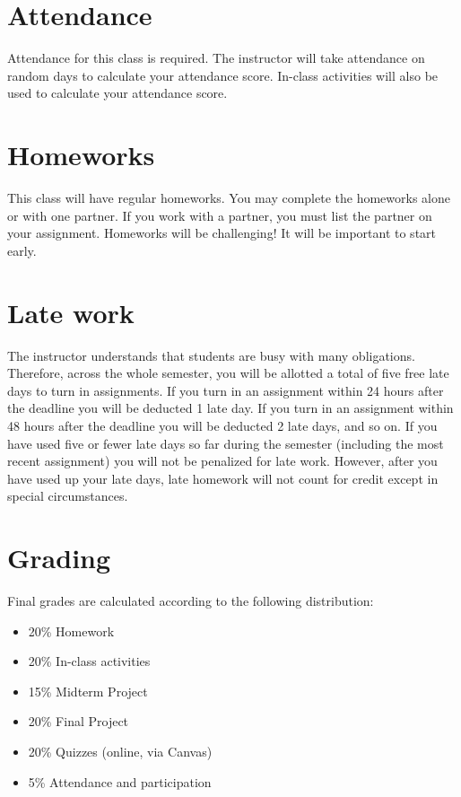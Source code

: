 \documentclass[10pt]{memoir}
\begin{document}
\section{\textbf{Attendance}}
Attendance for this class is required. 
The instructor will take attendance on random days to calculate your attendance score.
In-class activities will also be used to calculate your attendance score.

\section{\textbf{Homeworks}}
This class will have regular homeworks. 
You may complete the homeworks alone or with one partner. 
If you work with a partner, you must list the partner on your assignment. 
Homeworks will be challenging! It will be important to start early.

\section{\textbf{Late work}}
The instructor understands that students are busy with many obligations. 
Therefore, across the whole semester, you will be allotted a total of five free late days to turn in assignments. 
If you turn in an assignment within 24 hours after the deadline you will be deducted 1 late day. 
If you turn in an assignment within 48 hours after the deadline you will be deducted 2 late days, and so on. 
If you have used five or fewer late days so far during the semester (including the most recent assignment) you will not be penalized for late work. 
However, after you have used up your late days, late homework will not count for credit except in special circumstances.

\section{\textbf{Grading}}

Final grades are calculated according to the following distribution:
\begin{itemize}
\item 20\% Homework
\item 20\% In-class activities
\item 15\% Midterm Project
\item 20\% Final Project
\item 20\% Quizzes (online, via Canvas)
\item 5\% Attendance and participation
\end{itemize}
\end{document}
